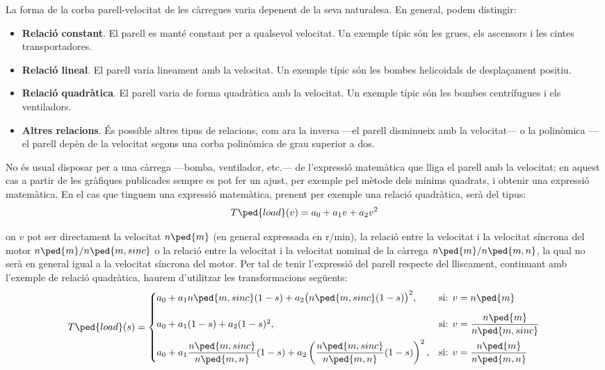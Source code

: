 La forma de la corba parell-velocitat de les càrregues varia depenent de la seva naturalesa. En general, podem distingir:
\begin{itemize}
	\item  \textbf{Relació constant}. El parell es manté constant per a qualsevol velocitat. Un exemple típic són les grues, els ascensors i les cintes transportadores.
	
	\item  \textbf{Relació lineal}. El parell varia lineament amb la velocitat. Un exemple típic són les bombes helicoidals de desplaçament positiu.
	
	\item  \textbf{Relació quadràtica}. El parell varia de forma  quadràtica  amb la velocitat. Un exemple típic són les bombes centrífugues i els ventiladors.
	
	\item  \textbf{Altres relacions}. És possible altres tipus de relacions, com ara la inversa ---el parell disminueix amb la velocitat--- o la polinòmica ---el parell depèn de la velocitat segons una corba polinòmica de grau superior a dos.
\end{itemize}

No és  usual disposar per a una càrrega ---bomba, ventilador, etc.---   de l'expressió matemàtica que lliga el parell amb la velocitat; en aquest cas a partir de les gràfiques publicades sempre es pot fer un ajust, per exemple pel mètode dels mínims quadrats, i obtenir una expressió matemàtica. En el cas que tinguem una expressió matemàtica, prenent per exemple una relació quadràtica, serà del tipus:
\begin{equation}
	T\ped{load}(v) = a_0 + a_1 v + a_2 v^2
\end{equation}

on $v$ pot ser directament la velocitat $n\ped{m}$ (en general expressada en r/min),  la relació entre la velocitat i la velocitat síncrona del motor $n\ped{m}/n\ped{m,sinc}$ o la relació entre la velocitat i la velocitat nominal de la càrrega $n\ped{m}/n\ped{m,n}$, la qual no serà en general igual a la velocitat síncrona del motor. Per tal de tenir l'expressió del parell respecte del lliscament,  continuant amb l'exemple de relació quadràtica, haurem d'utilitzar les transformacions següents:
\begin{equation}\label{eq:Tload-v-s}
	T\ped{load}(s) = \begin{cases}
		 a_0 + a_1 n\ped{m,sinc}(1-s) + a_2 \big(n\ped{m,sinc}(1-s)\big)^2,  & \text{si: } v=n\ped{m}  \\[2ex]
		a_0 + a_1 (1-s) + a_2 (1-s)^2, &   
		\text{si: } v =\dfrac{n\ped{m}}{n\ped{m,sinc}} \\[2ex]
		 a_0 + a_1 \dfrac{n\ped{m,sinc}}{n\ped{m,n}}(1-s) + a_2 \left(\dfrac{n\ped{m,sinc}}{n\ped{m,n}}(1-s)\right)^2, &  \text{si: }  v = \dfrac{n\ped{m}}{n\ped{m,n}}
	\end{cases}
\end{equation}


